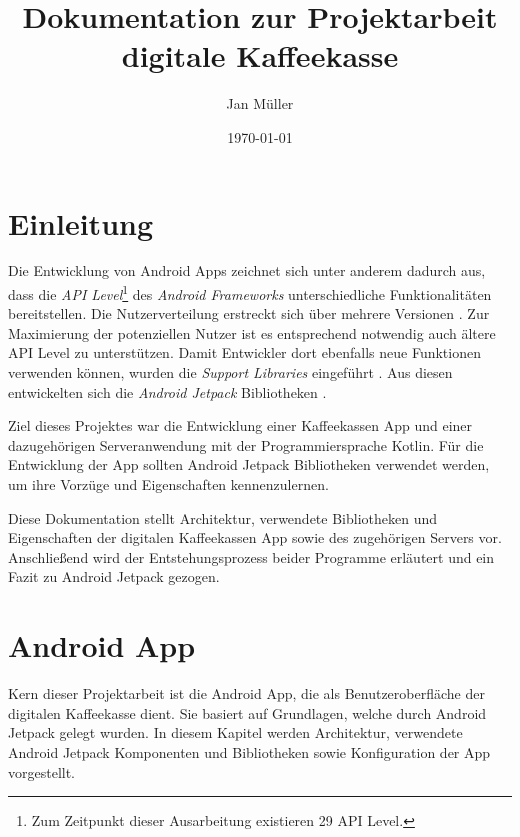 \documentclass[a4paper, 11pt]{article}
\title{Dokumentation zur Projektarbeit digitale Kaffeekasse}
\author{Jan Müller}
\date{\today}
\begin{document}
\maketitle

\section{Einleitung}
\label{sec:intro}
Die Entwicklung von Android Apps zeichnet sich unter anderem dadurch aus, dass die \textit{API Level}\footnote{Zum Zeitpunkt dieser Ausarbeitung existieren 29 API Level.} des \textit{Android Frameworks} unterschiedliche Funktionalitäten bereitstellen.
Die Nutzerverteilung erstreckt sich über mehrere Versionen \autocite{androidhistory}.
Zur Maximierung der potenziellen Nutzer ist es entsprechend notwendig auch ältere API Level zu unterstützen.
Damit Entwickler dort ebenfalls neue Funktionen verwenden können, wurden die \textit{Support Libraries} eingeführt \autocite{supportlibraries}.
Aus diesen entwickelten sich die \textit{Android Jetpack} Bibliotheken \autocite{androidjetpack}.

Ziel dieses Projektes war die Entwicklung einer Kaffeekassen App und einer dazugehörigen Serveranwendung mit der Programmiersprache Kotlin.
Für die Entwicklung der App sollten Android Jetpack Bibliotheken verwendet werden, um ihre Vorzüge und Eigenschaften kennenzulernen.

Diese Dokumentation stellt Architektur, verwendete Bibliotheken und Eigenschaften der digitalen Kaffeekassen App sowie des zugehörigen Servers vor.
Anschließend wird der Entstehungsprozess beider Programme erläutert und ein Fazit zu Android Jetpack gezogen.

\section{Android App}
\label{sec:app}
Kern dieser Projektarbeit ist die Android App, die als Benutzeroberfläche der digitalen Kaffeekasse dient.
Sie basiert auf Grundlagen, welche durch Android Jetpack gelegt wurden.
In diesem Kapitel werden Architektur, verwendete Android Jetpack Komponenten und Bibliotheken sowie Konfiguration der App vorgestellt.
\end{document}
